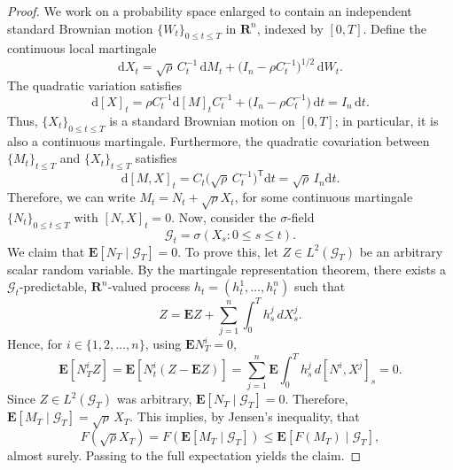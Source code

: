 \documentclass[10pt,a4paper]{amsart}
\newcommand{\E}{\mathbf E}
\newcommand{\R}{\mathbf R}
\newcommand{\cG}{\mathcal{G}}
\newcommand{\ud}{\mathrm{d}}
\begin{document}
\begin{proof}
We work on a probability space enlarged to contain an independent standard Brownian motion $\{W_t\}_{0 \leq t \leq T}$ in $\R^n$, indexed by $[0, T]$. Define the continuous local martingale
\[
\ud X_t
= \sqrt{\rho}\,C_t^{-1}\, \ud M_t
+
 \Big(I_n-\rho C_t^{-1}\Big)^{1/2} \, \ud W_t.
\]
The quadratic variation satisfies
\[
\ud [X]_t
=
\rho C_t^{-1} \ud [M]_t C_t^{-1}
+
\Big(I_n-\rho C_t^{-1}\Big) \, \ud t 
=
I_n \, \ud t.
\]
Thus, $\{X_t\}_{0 \leq t \leq T}$ is a standard Brownian motion on $[0, T]$; in particular, it is also a continuous martingale.
Furthermore, the quadratic covariation between $\{M_t\}_{t \leq T}$ and $\{X_t\}_{t \leq T}$ satisfies
\[
\ud[M,X]_t
=
C_t\Big(\sqrt{\rho}\,C_t^{-1}\Big)^{\mathsf T} 
\ud t 
=
\sqrt{\rho}\,I_n \ud t.
\]
Therefore, we can write $M_t = N_t + \sqrt{\rho} X_t$, 
for some continuous martingale $\{N_t\}_{0 \leq t \leq T}$ with $[N,X]_t=0$. 
Now, consider the $\sigma$-field
\[
\cG_t = \sigma(X_s:0\leq s\leq t).
\]
We claim that $\E[N_T \mid  \cG_T]=0$. 
To prove this, let $Z\in L^2(\cG_T)$ be an arbitrary scalar random variable. By the martingale
representation theorem, there exists a $\cG_t$-predictable, $\R^n$-valued process $h_t = (h_t^1, \dots, h_t^n)$ such that
\[
Z=\E Z+ \sum_{j=1}^n \int_0^T h_s^j \,dX_s^j.
\]
Hence, for $i \in \{1, 2, \dots, n\}$, using $\E N_T^i = 0$,  
\[
\E[N_T^i Z] = \E[N_t^i (Z-\E Z)]
=
\sum_{j=1}^n \E \int_0^T h_s^{j}\,d[N^i,X^j]_s
=
0.
\]
Since $Z \in L^2(\cG_T)$ was arbitrary, $\E[N_T \mid \cG_T] = 0$.  Therefore, $\E[M_T\mid\mathcal{G}_T]=\sqrt{\rho}\,X_T$.  
This implies, by Jensen's inequality, that 
\[
F(\sqrt{\rho} X_T) = F(\E[M_T \mid \cG_T]) \leq \E[F(M_T) \mid \cG_T],
\]
almost surely. Passing to the full expectation yields the claim.
\end{proof}
\end{document}
